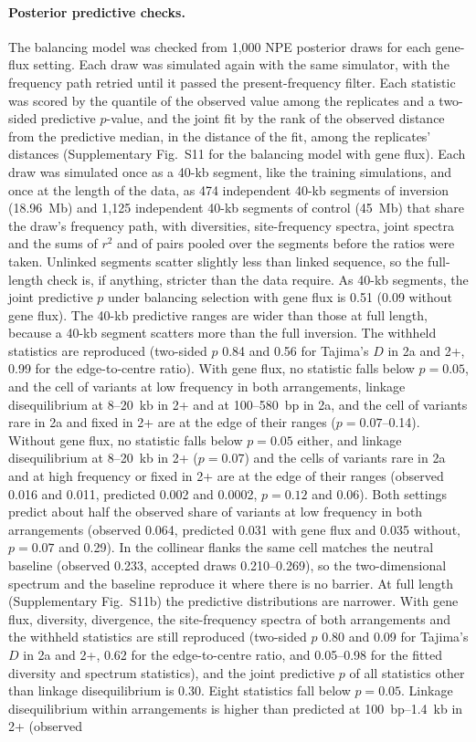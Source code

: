 \documentclass[11pt]{article}
\begin{document}
\paragraph{Posterior predictive checks.}
The balancing model was checked from 1{,}000 NPE posterior draws for each gene-flux setting. Each draw was simulated again with the same simulator, with the frequency path retried until it passed the present-frequency filter. Each statistic was scored by the quantile of the observed value among the replicates and a two-sided predictive $p$-value, and the joint fit by the rank of the observed distance from the predictive median, in the distance of the fit, among the replicates' distances (Supplementary Fig.~S11 for the balancing model with gene flux). Each draw was simulated once as a 40-kb segment, like the training simulations, and once at the length of the data, as 474 independent 40-kb segments of inversion (18.96~Mb) and 1{,}125 independent 40-kb segments of control (45~Mb) that share the draw's frequency path, with diversities, site-frequency spectra, joint spectra and the sums of $r^{2}$ and of pairs pooled over the segments before the ratios were taken. Unlinked segments scatter slightly less than linked sequence, so the full-length check is, if anything, stricter than the data require. As 40-kb segments, the joint predictive $p$ under balancing selection with gene flux is 0.51 (0.09 without gene flux). The 40-kb predictive ranges are wider than those at full length, because a 40-kb segment scatters more than the full inversion. The withheld statistics are reproduced (two-sided $p$ 0.84 and 0.56 for Tajima's $D$ in 2a and 2+, 0.99 for the edge-to-centre ratio). With gene flux, no statistic falls below $p=0.05$, and the cell of variants at low frequency in both arrangements, linkage disequilibrium at 8--20~kb in 2+ and at 100--580~bp in 2a, and the cell of variants rare in 2a and fixed in 2+ are at the edge of their ranges ($p=0.07$--0.14). Without gene flux, no statistic falls below $p=0.05$ either, and linkage disequilibrium at 8--20~kb in 2+ ($p=0.07$) and the cells of variants rare in 2a and at high frequency or fixed in 2+ are at the edge of their ranges (observed 0.016 and 0.011, predicted 0.002 and 0.0002, $p=0.12$ and 0.06). Both settings predict about half the observed share of variants at low frequency in both arrangements (observed 0.064, predicted 0.031 with gene flux and 0.035 without, $p=0.07$ and 0.29). In the collinear flanks the same cell matches the neutral baseline (observed 0.233, accepted draws 0.210--0.269), so the two-dimensional spectrum and the baseline reproduce it where there is no barrier. At full length (Supplementary Fig.~S11b) the predictive distributions are narrower. With gene flux, diversity, divergence, the site-frequency spectra of both arrangements and the withheld statistics are still reproduced (two-sided $p$ 0.80 and 0.09 for Tajima's $D$ in 2a and 2+, 0.62 for the edge-to-centre ratio, and 0.05--0.98 for the fitted diversity and spectrum statistics), and the joint predictive $p$ of all statistics other than linkage disequilibrium is 0.30. Eight statistics fall below $p=0.05$. Linkage disequilibrium within arrangements is higher than predicted at 100~bp--1.4~kb in 2+ (observed 
\end{document}
